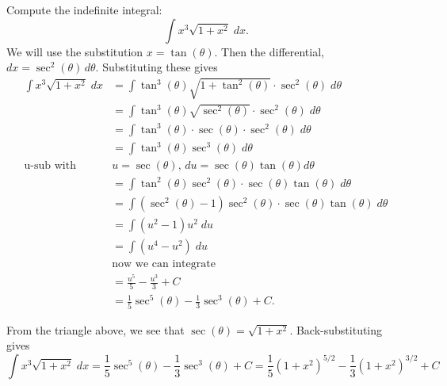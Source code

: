 \documentclass[handout]{ximera}
\begin{document}
\begin{example}[example 9]
Compute the indefinite integral:
\[
\int x^3\sqrt{1+x^2} \; dx.
\]
We will use the substitution $x = \tan(\theta)$.  Then the differential, 
$dx = \sec^2(\theta) \, d\theta$.  Substituting these gives
\begin{align*}
\int x^3\sqrt{1+x^2} \; dx &= \int \tan^3(\theta) \sqrt{1+\tan^2(\theta)} \cdot \sec^2(\theta) \; d\theta\\[6pt]
                           &= \int \tan^3(\theta) \sqrt{\sec^2(\theta)} \cdot \sec^2(\theta) \; d\theta\\[6pt]
                           &= \int \tan^3(\theta) \cdot \sec(\theta) \cdot \sec^2(\theta) \; d\theta\\[6pt]
                           &= \int \tan^3(\theta) \sec^3(\theta) \; d\theta\\[6pt]
                           \text{u-sub with } \; & u=\sec(\theta), \, du = \sec(\theta) \tan(\theta) d\theta\\[6pt]
                           &= \int \tan^2(\theta) \sec^2(\theta) \cdot \sec(\theta) \tan(\theta)\; d\theta\\[6pt]
                           &= \int \left(\sec^2(\theta)-1 \right) \sec^2(\theta) \cdot \sec(\theta) \tan(\theta)\; d\theta\\[6pt] 
                           &= \int (u^2 -1)u^2 \; du\\[6pt] 
                           &= \int (u^4 -u^2) \; du\\[6pt]
                           &\text{now we can integrate}\\[6pt]
                           &= \frac{u^5}{5} - \frac{u^3}{3} + C\\[6pt]
                           &= \frac15 \sec^5(\theta)  - \frac13 \sec^3(\theta) + C.
\end{align*}




\begin{image}
\end{image}




From the triangle above, we see that $\sec(\theta)= \sqrt{1+x^2}$.  Back-substituting gives
\[
\int x^3\sqrt{1+x^2} \; dx = \frac15 \sec^5(\theta)  - \frac13 \sec^3(\theta) + C = \frac15 (1+x^2)^{5/2}  - \frac13 (1+x^2)^{3/2} + C
\]

\end{example}
\end{document}

